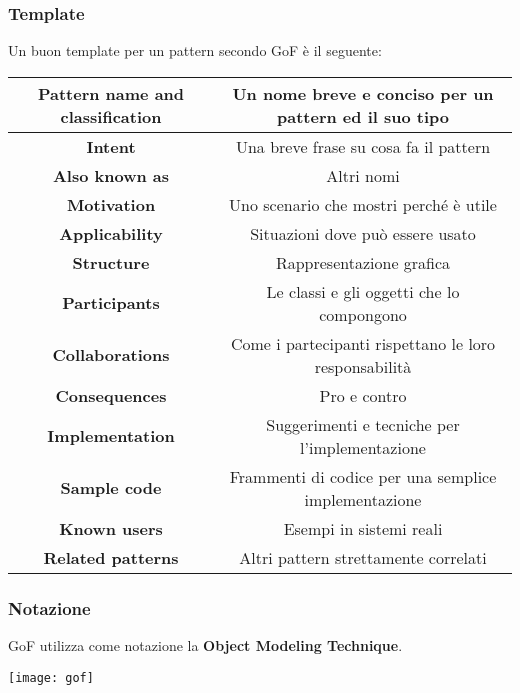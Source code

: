 \newpage
\subsubsection{Template}
Un buon template per un pattern secondo GoF è il seguente:
\begin{table}[!h]
	\centering
	\begin{tabular}{|c|c|}
		\hline
		\textbf{Pattern name and classification} & Un nome breve e conciso per un pattern ed il suo tipo \\
		\hline
		\textbf{Intent} & Una breve frase su cosa fa il pattern \\
		\hline
		\textbf{Also known as} & Altri nomi \\
		\hline
		\textbf{Motivation} & Uno scenario che mostri perché è utile \\
		\hline
		\textbf{Applicability} & Situazioni dove può essere usato \\
		\hline
		\textbf{Structure} & Rappresentazione grafica \\
		\hline
		\textbf{Participants} & Le classi e gli oggetti che lo compongono\\
		\hline
		\textbf{Collaborations} & Come i partecipanti rispettano le loro responsabilità \\
		\hline
		\textbf{Consequences} & Pro e contro \\
		\hline
		\textbf{Implementation} & Suggerimenti e tecniche per l'implementazione \\
		\hline
		\textbf{Sample code} & Frammenti di codice per una semplice implementazione \\
		\hline
		\textbf{Known users} & Esempi in sistemi reali \\
		\hline
		\textbf{Related patterns} & Altri pattern strettamente correlati \\
		\hline
	\end{tabular}
\end{table}

\subsubsection{Notazione}
GoF utilizza come notazione la \textbf{Object Modeling Technique}.
\begin{center}
	\texttt{[image: gof]}
\end{center}

\newpage
